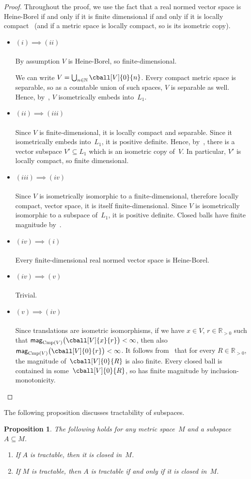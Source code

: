 \documentclass[11pt]{article}
\theoremstyle{plain}
\newtheorem{proposition}[theorem]{Proposition}
\theoremstyle{definition}
\newcommand{\proven}[1]{\underline{#1} \\ \ \vspace{-2ex} \\}
\newcommand{\NN}{\mathbb{N}}
\newcommand{\RR}{\mathbb{R}}
\newcommand{\mg}[1][]{\mathsf{mag}_{#1}}
\newcommand{\csub}{\mathrm{Cmp}}
\begin{document}
\begin{proof}
Throughout the proof, we use the fact that a real normed vector space is Heine-Borel if and only if it is finite dimensional if and only if it is locally compact~\cite[Theorems 1.22, 1.23]{rudin1991functional} (and if a metric space is locally compact, so is its isometric copy).
\begin{itemize}
\item\proven{$(i) \implies (ii)$}
By assumption $V$ is Heine-Borel, so finite-dimensional.

We can write $V = \bigcup_{n \in \NN} \cball[V]{0}{n}$. Every compact metric space is separable, so as a countable union of such spaces, $V$ is separable as well. Hence, by~\cite[Corollary~3.5]{meckes2013}, $V$ isometrically embeds into~$L_1$.
\item\proven{$(ii) \implies (iii)$}
Since $V$ is finite-dimensional, it is locally compact and separable. Since it isometrically embeds into~$L_1$, it is positive definite. Hence, by~\cite[Corollary~3.5]{meckes2013}, there is a vector subspace $V' \subseteq L_1$ which is an isometric copy of~$V$. In particular, $V'$ is locally compact, so finite dimensional.
\item\proven{$(iii) \implies (iv)$}
Since $V$ is isometrically isomorphic to a finite-dimensional, therefore locally compact, vector space, it is itself finite-dimensional. Since $V$ is isometrically isomorphic to a subspace of~$L_1$, it is positive definite. Closed balls have finite magnitude by~\cite[Theorem~3.1]{leinster2023spaces}.
\item\proven{$(iv) \implies (i)$}
Every finite-dimensional real normed vector space is Heine-Borel.
\item\proven{$(iv) \implies (v)$}
Trivial.
\item\proven{$(v) \implies (iv)$}
Since translations are isometric isomorphisms, if we have $x \in V$, $r \in \RR_{> 0}$ such that $\mg[\csub(V)]\big(\cball[V]{x}{r}\big) < \infty$, then also $\mg[\csub(V)]\big(\cball[V]{0}{r}\big) < \infty$. It follows from~\cite[Corollary~2.4]{leinster2023spaces} that for every $R \in \RR_{> 0}$, the magnitude of~$\cball[V]{0}{R}$ is also finite. Every closed ball is contained in some~$\cball[V]{0}{R}$, so has finite magnitude by inclusion-monotonicity.
\end{itemize}
\end{proof}

The following proposition discusses tractability of subspaces.

\begin{proposition}\label{proposition:tractable-subspace}
The following holds for any metric space~$M$ and a subspace $A \subseteq M$.
\begin{enumerate}
\item
If $A$ is tractable, then it is closed in~$M$.
\item
If $M$ is tractable, then $A$ is tractable if and only if it is closed in~$M$.
\end{enumerate}
\end{proposition}
\end{document}
